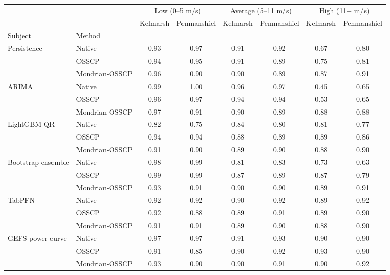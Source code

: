 \begin{tabular}{@{}llcccccc@{}}
\toprule
 &  & \multicolumn{2}{c}{Low (0--5 m/s)} & \multicolumn{2}{c}{Average (5--11 m/s)} & \multicolumn{2}{c}{High (11+ m/s)} \\
 &  & Kelmarsh & Penmanshiel & Kelmarsh & Penmanshiel & Kelmarsh & Penmanshiel \\
Subject & Method &  &  &  &  &  &  \\
\midrule
\multirow[t]{3}{*}{Persistence} & Native & 0.93 & 0.97 & 0.91 & 0.92 & 0.67 & 0.80 \\
 & OSSCP & 0.94 & 0.95 & 0.91 & 0.89 & 0.75 & 0.81 \\
 & Mondrian-OSSCP & 0.96 & 0.90 & 0.90 & 0.89 & 0.87 & 0.91 \\
\cmidrule{1-8}
\multirow[t]{3}{*}{ARIMA} & Native & 0.99 & 1.00 & 0.96 & 0.97 & 0.45 & 0.65 \\
 & OSSCP & 0.96 & 0.97 & 0.94 & 0.94 & 0.53 & 0.65 \\
 & Mondrian-OSSCP & 0.97 & 0.91 & 0.90 & 0.89 & 0.88 & 0.88 \\
\cmidrule{1-8}
\multirow[t]{3}{*}{LightGBM-QR} & Native & 0.82 & 0.75 & 0.84 & 0.80 & 0.81 & 0.77 \\
 & OSSCP & 0.94 & 0.94 & 0.88 & 0.89 & 0.89 & 0.86 \\
 & Mondrian-OSSCP & 0.91 & 0.90 & 0.89 & 0.90 & 0.88 & 0.90 \\
\cmidrule{1-8}
\multirow[t]{3}{*}{Bootstrap ensemble} & Native & 0.98 & 0.99 & 0.81 & 0.83 & 0.73 & 0.63 \\
 & OSSCP & 0.99 & 0.99 & 0.87 & 0.89 & 0.87 & 0.79 \\
 & Mondrian-OSSCP & 0.93 & 0.91 & 0.90 & 0.90 & 0.89 & 0.91 \\
\cmidrule{1-8}
\multirow[t]{3}{*}{TabPFN} & Native & 0.92 & 0.92 & 0.90 & 0.92 & 0.89 & 0.92 \\
 & OSSCP & 0.92 & 0.88 & 0.89 & 0.91 & 0.89 & 0.90 \\
 & Mondrian-OSSCP & 0.91 & 0.91 & 0.89 & 0.90 & 0.88 & 0.90 \\
\cmidrule{1-8}
\multirow[t]{3}{*}{GEFS power curve} & Native & 0.97 & 0.97 & 0.91 & 0.93 & 0.90 & 0.90 \\
 & OSSCP & 0.91 & 0.85 & 0.90 & 0.92 & 0.93 & 0.90 \\
 & Mondrian-OSSCP & 0.93 & 0.90 & 0.90 & 0.91 & 0.90 & 0.92 \\
\cmidrule{1-8}
\bottomrule
\end{tabular}
